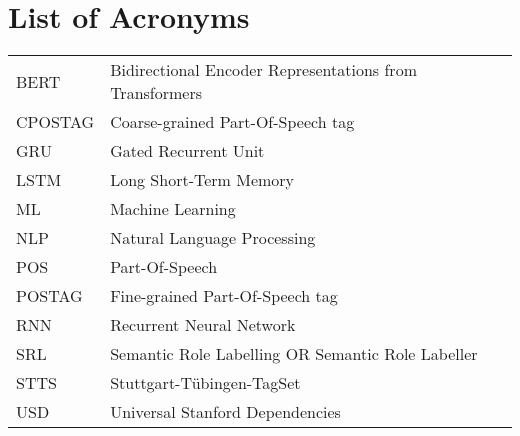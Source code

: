 {}
\chapter*{List of Acronyms}

\begin{supertabular}{lp{12.5cm}}
BERT & Bidirectional Encoder Representations from Transformers\\
CPOSTAG &  Coarse-grained Part-Of-Speech tag\\
GRU & Gated Recurrent Unit\\
LSTM & Long Short-Term Memory\\
ML & Machine Learning\\
NLP & Natural Language Processing\\
POS & Part-Of-Speech\\
POSTAG & Fine-grained Part-Of-Speech tag\\
RNN & Recurrent Neural Network\\
SRL & Semantic Role Labelling OR Semantic Role Labeller\\
STTS & Stuttgart-Tübingen-TagSet\\
USD & Universal Stanford Dependencies\\
\end{supertabular}

\newpage
